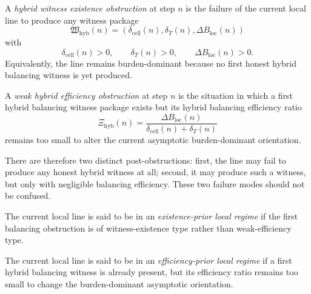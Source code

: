 \begin{definition}
\label{def:hybrid-witness-existence-obstruction}
A \emph{hybrid witness existence obstruction} at step \(n\) is the failure of the current local line to produce any witness package
\[
 \mathfrak W_{\mathrm{hyb}}(n)
 =
 (\delta_{\mathrm{cell}}(n),\delta_T(n),\Delta B_{\mathrm{loc}}(n))
\]
with
\[
 \delta_{\mathrm{cell}}(n)>0,
 \qquad
 \delta_T(n)>0,
 \qquad
 \Delta B_{\mathrm{loc}}(n)>0.
\]
Equivalently, the line remains burden-dominant because no first honest hybrid balancing witness is yet produced.
\end{definition}

\begin{definition}
\label{def:weak-hybrid-efficiency-obstruction}
A \emph{weak hybrid efficiency obstruction} at step \(n\) is the situation in which a first hybrid balancing witness package exists but its hybrid balancing efficiency ratio
\[
 \Xi_{\mathrm{hyb}}(n)
 =
 \frac{\Delta B_{\mathrm{loc}}(n)}{\delta_{\mathrm{cell}}(n)+\delta_T(n)}
\]
remains too small to alter the current asymptotic burden-dominant orientation.
\end{definition}

\begin{remark}
\label{rem:existence-versus-efficiency}
There are therefore two distinct post-obstructions:
first, the line may fail to produce any honest hybrid witness at all;
second, it may produce such a witness, but only with negligible balancing efficiency.
These two failure modes should not be confused.
\end{remark}

\begin{definition}
\label{def:existence-prior-local-regime}
The current local line is said to be in an \emph{existence-prior local regime} if the first balancing obstruction is of witness-existence type rather than weak-efficiency type.
\end{definition}

\begin{definition}
\label{def:efficiency-prior-local-regime}
The current local line is said to be in an \emph{efficiency-prior local regime} if a first hybrid balancing witness is already present, but its efficiency ratio remains too small to change the burden-dominant asymptotic orientation.
\end{definition}

